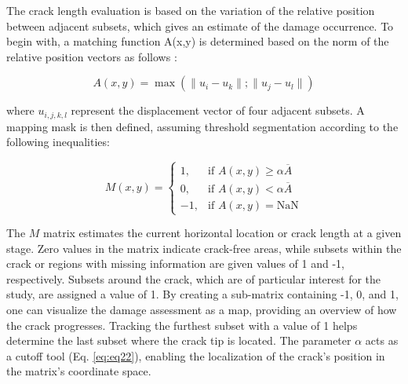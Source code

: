 \documentclass[3p,times,procedia]{elsarticle}
\begin{document}


The crack length evaluation is based on the variation of the relative position between adjacent subsets, which gives an estimate of the damage occurrence. To begin with, a matching function A(x,y) is determined based on the norm of the relative position vectors as follows \citep{Xavieretal2014}:

\vspace{0pt}
\begin{equation}
	A(x,y)=\max(\lVert u_i-u_k\rVert;\lVert u_j-u_l\rVert)
	\label{eq:eq21}
\end{equation}

\noindent where $u_{i,j,k,l}$ represent the displacement vector of four adjacent subsets. A mapping mask is then defined, assuming threshold segmentation according to the following inequalities:

\begin{equation}
	M(x,y)=
	\begin{cases}
		1, & \text{if } A(x, y) \geq \alpha \overline{A} \\
		0, & \text{if } A(x, y) < \alpha \overline{A} \\
		-1, & \text{if } A(x, y) = \textrm{NaN}
	\end{cases}
	\label{eq:eq22}
\end{equation}

\noindent The $M$ matrix estimates the current horizontal location or crack length at a given stage. Zero values in the matrix indicate crack-free areas, while subsets within the crack or regions with missing information are given values of 1 and -1, respectively. Subsets around the crack, which are of particular interest for the study, are assigned a value of 1. By creating a sub-matrix containing -1, 0, and 1, one can visualize the damage assessment as a map, providing an overview of how the crack progresses. Tracking the furthest subset with a value of 1 helps determine the last subset where the crack tip is located. The parameter $\alpha$ acts as a cutoff tool (Eq. \ref*{eq:eq22}), enabling the localization of the crack's position in the matrix's coordinate space.
\end{document}
